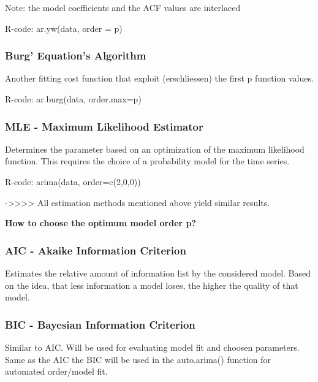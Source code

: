\documentclass[
]{article}
\begin{document}
Note: the model coefficients and the ACF values are interlaced

R-code: ar.yw(data, order = p)

\hypertarget{burg-equations-algorithm}{%
\subsubsection{Burg' Equation's
Algorithm}\label{burg-equations-algorithm}}

Another fitting cost function that exploit (erschliessen) the first p
function values.

R-code: ar.burg(data, order.max=p)

\hypertarget{mle---maximum-likelihood-estimator}{%
\subsubsection{MLE - Maximum Likelihood
Estimator}\label{mle---maximum-likelihood-estimator}}

Determines the parameter based on an optimization of the maximum
likelihood function. This requires the choice of a probability model for
the time series.

R-code: arima(data, order=c(2,0,0))

-\textgreater\textgreater\textgreater\textgreater{} All estimation
methods mentioned above yield similar results.

\textbf{How to choose the optimum model order p?}

\hypertarget{aic---akaike-information-criterion}{%
\subsubsection{AIC - Akaike Information
Criterion}\label{aic---akaike-information-criterion}}

Estimates the relative amount of information list by the considered
model. Based on the idea, that less information a model loses, the
higher the quality of that model.

\hypertarget{bic---bayesian-information-criterion}{%
\subsubsection{BIC - Bayesian Information
Criterion}\label{bic---bayesian-information-criterion}}

Similar to AIC. Will be used for evaluating model fit and choosen
parameters. Same as the AIC the BIC will be used in the auto.arima()
function for automated order/model fit.
\end{document}
